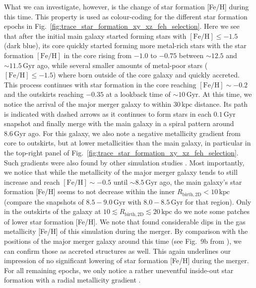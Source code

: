 \documentclass[fleqn,usenatbib]{mnras}
\begin{document}
What we can investigate, however, is the change of star formation [Fe/H] during this time. This property is used as colour-coding for the different star formation epochs in Fig.~\ref{fig:trace_star_formation_xy_xz_feh_selection}. Here we see that after the initial main galaxy started forming stars with $\mathrm{[Fe/H]} \leq -1.5$ (dark blue), its core quickly started forming more metal-rich stars with the star formation $\mathrm{[Fe/H]}$ in the core rising from $-1.0$ to $-0.75$ between $\sim 12.5$ and $\sim11.5\,\mathrm{Gyr}$ ago, while several smaller amounts of metal-poor stars ($\mathrm{[Fe/H]} \leq -1.5$) where born outside of the core galaxy and quickly accreted. This process continues with star formation in the core reaching $\mathrm{[Fe/H]} \sim -0.2$ and the outskirts reaching $-0.35$ at a lookback time of $\sim 10\,\mathrm{Gyr}$. At this time, we notice the arrival of the major merger galaxy to within $30\,\mathrm{kpc}$ distance. Its path is indicated with dashed arrows as it continues to form stars in each $0.1\,\mathrm{Gyr}$ snapshot and finally merge with the main galaxy in a spiral pattern around $8.6\,\mathrm{Gyr}$ ago. For this galaxy, we also note a negative metallicity gradient from core to outskirts, but at lower metallicities than the main galaxy, in particular in the top-right panel of Fig.~\ref{fig:trace_star_formation_xy_xz_feh_selection}. Such gradients were also found by other simulation studies \citep{Amarante2022, Khoperskov2023d, Mori2024, Carrillo2025}. Most importantly, we notice that while the metallicity of the major merger galaxy tends to still increase and reach $\mathrm{[Fe/H]} \sim -0.5$ until $\sim 8.5\,\mathrm{Gyr}$ ago, the main galaxy's star formation [Fe/H] seems to not decrease within the inner $R_\mathrm{birth,2D} < 10\,\mathrm{kpc}$ (compare the snapshots of $8.5-9.0\,\mathrm{Gyr}$ with $8.0-8.5\,\mathrm{Gyr}$ for that region). Only in the outskirts of the galaxy at $10 \lesssim R_\mathrm{birth, 2D} \lesssim 20\,\mathrm{kpc}$ do we note some patches of lower star formation [Fe/H]. We note that \citet{Buck2023} found considerable dips in the gas metallicity [Fe/H] of this simulation during the merger. By comparison with the positions of the major merger galaxy around this time (see Fig.~9b from ), we can confirm those as accreted structures as well. This again underlines our impression of no significant lowering of star formation [Fe/H] during the merger. For all remaining epochs, we only notice a rather uneventful inside-out star formation with a radial metallicity gradient \citep[see also][]{Buder2025}.
\end{document}

